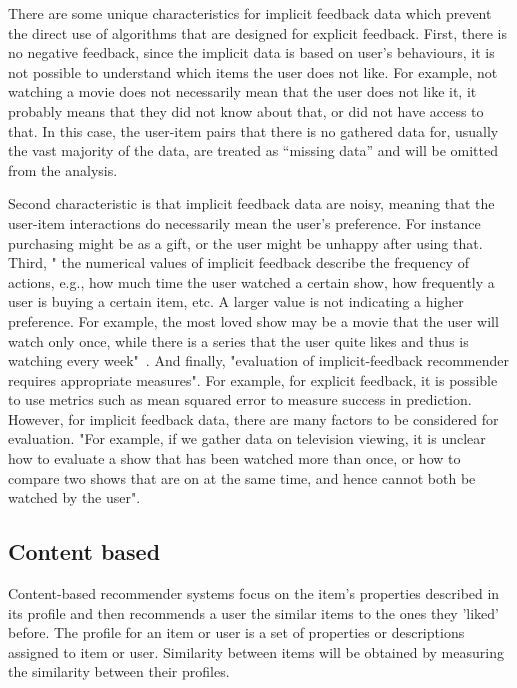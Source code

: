 There are some unique characteristics for implicit feedback data  which prevent the direct use of algorithms that are designed for explicit feedback. First, there is no negative feedback, since the implicit data is based on user's behaviours, it is not possible to understand which items the user does not like. For example, not watching a movie does not necessarily mean that the user does not like it, it probably means that they did not know about that, or did not have access to that. In this case, the user-item pairs that there is no gathered data for, usually the vast
majority of the data, are treated as “missing data” and will be omitted from the analysis. 

Second characteristic is that implicit feedback data are noisy, meaning that the user-item interactions do necessarily mean the user's preference. For instance purchasing might be as a gift, or the user might be unhappy after using that. Third, " the numerical values of implicit feedback describe the frequency of actions, e.g., how much time the user watched a certain show,
how frequently a user is buying a certain item, etc. A larger value is not indicating a higher preference. For example, the most loved show may be a movie that the user will watch only once, while there is a series that the user quite likes and thus is watching every week"~\cite{hu2008collaborative}. And finally, "evaluation of implicit-feedback recommender requires appropriate measures". For example, for explicit feedback, it is possible to use metrics such as mean squared error to measure success in prediction. However, for implicit feedback data, there are many factors to be considered for evaluation. "For example, if we gather data on television viewing, it is unclear how to evaluate a show that has been watched
more than once, or how to compare two shows that are
on at the same time, and hence cannot both be watched
by the user".  

\subsection{Content based}
Content-based recommender systems focus on the item's properties described in its profile and then recommends a user the similar items to the ones they 'liked' before. The profile for an item or user is a set of properties or descriptions assigned to item or user. Similarity between items will be obtained by measuring the similarity between their profiles. 


